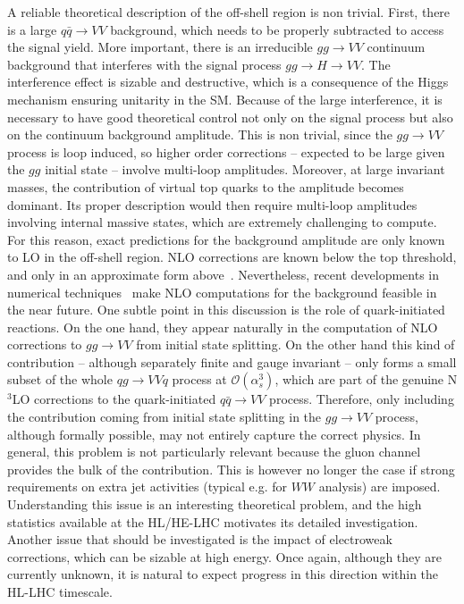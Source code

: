 A reliable theoretical description of the off-shell region is non trivial. First, there is a large
$q\bar q \to VV$ background, which needs to be properly subtracted to access the signal yield. 
More important, there is an irreducible $gg\to VV $ continuum background that interferes with the
signal process $gg\to H\to VV$. The interference effect is sizable and destructive, which is a 
consequence of the Higgs mechanism ensuring unitarity in the SM. Because of the large interference,
it is necessary to have
good theoretical control not only on the signal process but also on the continuum background 
amplitude. This is non trivial, since the $gg\to VV$ process is loop induced, so higher order
corrections -- expected to be large given the $gg$ initial state -- involve multi-loop amplitudes.
Moreover, at large invariant masses, the contribution of virtual top quarks to the amplitude becomes
dominant. Its proper description would then require multi-loop amplitudes involving internal massive
states, which are extremely challenging to compute. For this reason, exact predictions for the
background amplitude are only known to LO in the off-shell region. NLO corrections are known below
the top threshold, and only in an approximate form 
above~\cite{Caola:2016trd,Campbell:2016ivq,Campbell:2014gua,Caola:2015psa,Caola:2015rqy,Bonvini:2013jha,Alioli:2016xab}. 
Nevertheless, recent developments in 
numerical techniques~\cite{Borowka:2016ehy} 
make NLO computations for the background feasible in the near
future. One subtle point in this discussion is the role of quark-initiated reactions. On the one
hand, they appear naturally in the computation of NLO corrections to $gg\to VV$ from initial
state splitting. On the other hand this kind of contribution -- although separately finite and 
gauge invariant -- only forms a small subset of the whole $qg \to VV q$ process at 
$\mathcal O(\alpha_s^3)$, which are part of the genuine N$^3$LO corrections to the 
quark-initiated $q\bar q\to VV$ process. Therefore, only including  
the contribution coming from initial
state splitting in the $gg\to VV$ process, although formally possible, may not entirely
capture the correct physics. In general, this problem is not particularly relevant because
the gluon channel provides the bulk of the contribution. This is however no longer the case if
strong requirements on extra jet activities (typical e.g. for $WW$ analysis) are imposed. 
Understanding this issue is an interesting theoretical problem, and the high statistics
available at the HL/HE-LHC motivates its detailed investigation. Another issue that should be 
investigated is the impact of electroweak corrections, which can be sizable at high energy. Once again, 
although they are currently unknown, it is natural to expect progress in this direction within the HL-LHC timescale. 

